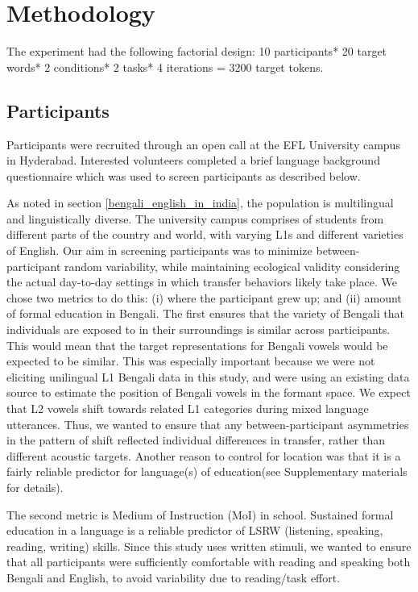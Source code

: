 \documentclass[12 pt]{article}
\begin{document}
\section{Methodology} \label{methodology}
The experiment had the following factorial design: 10 participants* 20 target words* 2 conditions* 2 tasks* 4 iterations = 3200 target tokens.

\subsection{Participants} \label{participants}
Participants were recruited through an open call at the EFL University campus in Hyderabad. Interested volunteers completed a brief language background questionnaire which was used to screen participants as described below. 

As noted in section \ref{bengali_english_in_india}, the population is multilingual and linguistically diverse. The university campus comprises of students from different parts of the country and world, with varying L1s and different varieties of English. Our aim in screening participants was to minimize between-participant random variability, while maintaining ecological validity considering the actual day-to-day settings in which transfer behaviors likely take place. We chose two metrics to do this: (i) where the participant grew up; and (ii) amount of formal education in Bengali. The first ensures that the variety of Bengali that individuals are exposed to in their surroundings is similar across participants. This would mean that the target representations for Bengali vowels would be expected to be similar. This was especially important because we were not eliciting unilingual L1 Bengali data in this study, and were using an existing data source to estimate the position of Bengali vowels in the formant space. We expect that L2 vowels shift towards related L1 categories during mixed language utterances. Thus, we wanted to ensure that any between-participant asymmetries in the pattern of shift reflected individual differences in transfer, rather than different acoustic targets. Another reason to control for location was that it is a fairly reliable predictor for language(s) of education(see Supplementary materials for details).

The second metric is Medium of Instruction (MoI) in school. Sustained formal education in a language is a reliable predictor of LSRW (listening, speaking, reading, writing) skills. Since this study uses written stimuli, we wanted to ensure that all participants were sufficiently comfortable with reading and speaking both Bengali and English, to avoid variability due to reading/task effort.  
\end{document}
